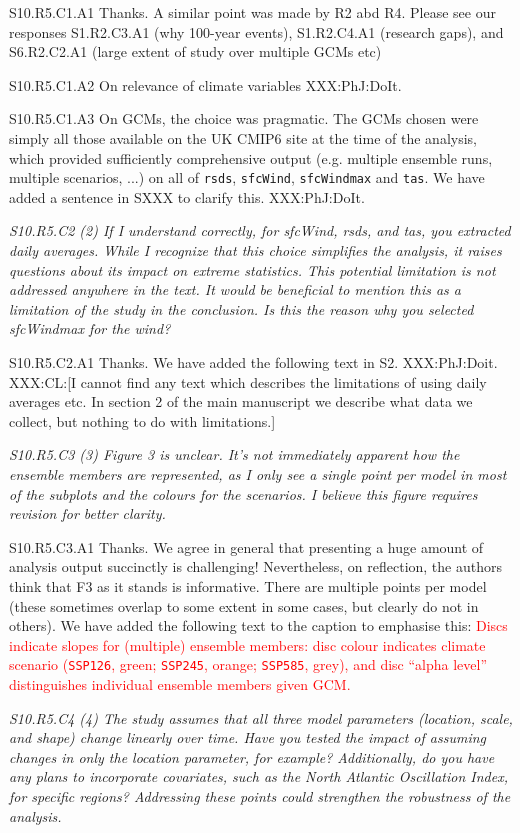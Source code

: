 \documentclass[a4paper,10pt]{article}
\newcommand{\ed}[1]{\textcolor{red}{#1}}
\providecommand{\RS}{\texttt{rsds}\xspace}
\providecommand{\WS}{\texttt{sfcWind}\xspace}
\providecommand{\WM}{\texttt{sfcWindmax}\xspace}
\providecommand{\TA}{\texttt{tas}\xspace}
\providecommand{\SL}{\texttt{SSP126}\xspace}
\providecommand{\SM}{\texttt{SSP245}\xspace}
\providecommand{\SH}{\texttt{SSP585}\xspace}
\begin{document}
	S10.R5.C1.A1 Thanks. A similar point was made by R2 abd R4. Please see our responses S1.R2.C3.A1 (why 100-year events), S1.R2.C4.A1 (research gaps), and S6.R2.C2.A1 (large extent of study over multiple GCMs etc)
	
	S10.R5.C1.A2 On relevance of climate variables XXX:PhJ:DoIt.
	
	S10.R5.C1.A3 On GCMs, the choice was pragmatic. The GCMs chosen were simply all those available on the UK CMIP6 site at the time of the analysis, which provided sufficiently comprehensive output (e.g. multiple ensemble runs, multiple scenarios, ...) on all of \RS, \WS, \WM and \TA. We have added a sentence in SXXX to clarify this. XXX:PhJ:DoIt.  

	\emph{S10.R5.C2 (2) If I understand correctly, for sfcWind, rsds, and tas, you extracted daily averages. While I recognize that this choice simplifies the analysis, it raises questions about its impact on extreme statistics. This potential limitation is not addressed anywhere in the text. It would be beneficial to mention this as a limitation of the study in the conclusion. Is this the reason why you selected sfcWindmax for the wind?}

	S10.R5.C2.A1 Thanks. We have added the following text in S2. XXX:PhJ:Doit. XXX:CL:[I cannot find any text which describes the limitations of using daily averages etc. In section 2 of the main manuscript we describe what data we collect, but nothing to do with limitations.]

	\emph{S10.R5.C3 (3) Figure 3 is unclear. It's not immediately apparent how the ensemble members are represented, as I only see a single point per model in most of the subplots and the colours for the scenarios. I believe this figure requires revision for better clarity.}

	S10.R5.C3.A1 Thanks. We agree in general that presenting a huge amount of analysis output succinctly is challenging! Nevertheless, on reflection, the authors think that F3 as it stands is informative. There are multiple points per model (these sometimes overlap to some extent in some cases, but clearly do not in others). We have added the following text to the caption to emphasise this: \ed{Discs indicate slopes for (multiple) ensemble members: disc colour indicates climate scenario (\SL, green; \SM, orange; \SH, grey), and disc ``alpha level'' distinguishes individual ensemble members given GCM.}

	\emph{S10.R5.C4 (4) The study assumes that all three model parameters (location, scale, and shape) change linearly over time. Have you tested the impact of assuming changes in only the location parameter, for example? Additionally, do you have any plans to incorporate covariates, such as the North Atlantic Oscillation Index, for specific regions? Addressing these points could strengthen the robustness of the analysis.}
\end{document}
